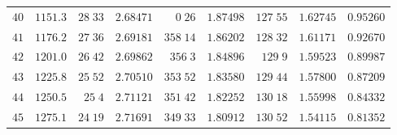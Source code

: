 \begin{center}
\begin{tabular}{r|r|r|r|r|r|r|r|r}
$40$&$1151.3$&$28\;33$&$2.68471$&$0\;26$&$1.87498$&$127\;55$&$1.62745$&$0.95260$\\
$41$&$1176.2$&$27\;36$&$2.69181$&$358\;14$&$1.86202$&$128\;32$&$1.61171$&$0.92670$\\
$42$&$1201.0$&$26\;42$&$2.69862$&$356\;3$&$1.84896$&$129\;9$&$1.59523$&$0.89987$\\
$43$&$1225.8$&$25\;52$&$2.70510$&$353\;52$&$1.83580$&$129\;44$&$1.57800$&$0.87209$\\
$44$&$1250.5$&$25\;4$&$2.71121$&$351\;42$&$1.82252$&$130\;18$&$1.55998$&$0.84332$\\[2pt]
$45$&$1275.1$&$24\;19$&$2.71691$&$349\;33$&$1.80912$&$130\;52$&$1.54115$&$0.81352$\\
\hline
\end{tabular}
\end{center}
\endgroup
\clearpage
{}
\begingroup
\fontsize{9}{10.2}\selectfont
\setlength{\tabcolsep}{1.5pt}
\renewcommand{\arraystretch}{1.02}
